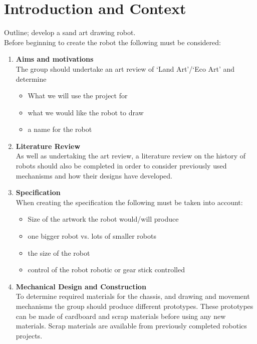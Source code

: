 \chapter{Introduction and Context}\label{introduction}\label{research}\label{section \thechapter}

\label{project brief}
    Outline; develop a sand art drawing robot.\\
    Before beginning to create the robot the following must be considered:
    \begin{enumerate}
        \item \textbf{Aims and motivations}\\
        The group should undertake an art review of `Land Art'/`Eco Art' and determine
        \begin{itemize}
            \item What we will use the project for
            \item what we would like the robot to draw
            \item a name for the robot
        \end{itemize}

        \item\textbf{Literature Review}\\
        As well as undertaking the art review, a literature review on the history of robots should also be completed in order to consider previously used mechanisms and how their designs have developed.

        \item\textbf{Specification}\\
        When creating the specification the following must be taken into account:
        \begin{itemize}
            \item Size of the artwork the robot would/will produce
            \item one bigger robot vs. lots of smaller robots
            \item the size of the robot
            \item control of the robot \ie robotic or gear stick controlled
        \end{itemize}

        \item \textbf{Mechanical Design and Construction}\\
        To determine required materials for the chassis, and drawing and movement mechanisms the group should produce different prototypes. These prototypes can be made of cardboard and scrap materials before using any new materials. Scrap materials are available from previously completed robotics projects.


\end{enumerate}
